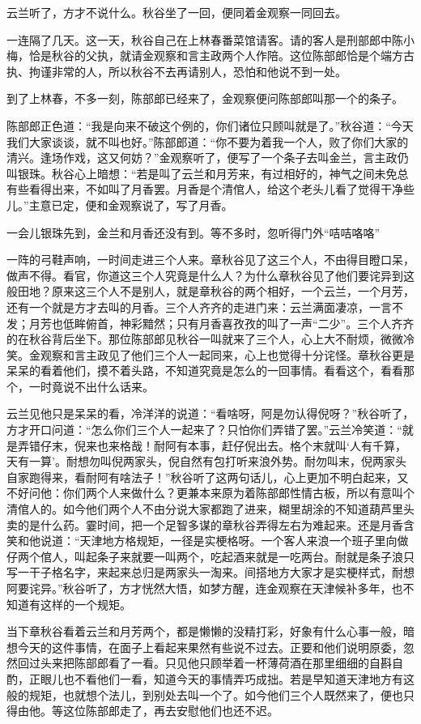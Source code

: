 \documentclass[12pt,UTF8]{ctexbook}
\begin{document}
{{{云兰听了，方才不说什么。秋谷坐了一回，便同着金观察一同回去。

一连隔了几天。这一天，秋谷自己在上林春番菜馆请客。请的客人是刑部郎中陈小梅，恰是秋谷的父执，就请金观察和言主政两个人作陪。这位陈部郎恰是个端方古执、拘谨非常的人，所以秋谷不去再请别人，恐怕和他说不到一处。

到了上林春，不多一刻，陈部郎已经来了，金观察便问陈部郎叫那一个的条子。

陈部郎正色道：“我是向来不破这个例的，你们诸位只顾叫就是了。”秋谷道：“今天我们大家谈谈，就不叫也好。”陈部郎道：“你不要为着我一个人，败了你们大家的清兴。逢场作戏，这又何妨？”金观察听了，便写了一个条子去叫金兰，言主政仍叫银珠。秋谷心上暗想：“若是叫了云兰和月芳来，有过相好的，神气之间未免总有些看得出来，不如叫了月香罢。月香是个清倌人，给这个老头儿看了觉得干净些儿。”主意已定，便和金观察说了，写了月香。

一会儿银珠先到，金兰和月香还没有到。等不多时，忽听得门外“咭咭咯咯”

一阵的弓鞋声响，一时间走进三个人来。章秋谷见了这三个人，不由得目瞪口呆，做声不得。看官，你道这三个人究竟是什么人？为什么章秋谷见了他们要诧异到这般田地？原来这三个人不是别人，就是章秋谷的两个相好，一个云兰，一个月芳，还有一个就是方才去叫的月香。三个人齐齐的走进门来：云兰满面凄凉，一言不发；月芳也低眸俯首，神彩黯然；只有月香喜孜孜的叫了一声“二少”。三个人齐齐的在秋谷背后坐下。那位陈部郎见秋谷一叫就来了三个人，心上大不耐烦，微微冷笑。金观察和言主政见了他们三个人一起同来，心上也觉得十分诧怪。章秋谷更是呆呆的看着他们，摸不着头路，不知道究竟是怎么的一回事情。看看这个，看看那个，一时竟说不出什么话来。

云兰见他只是呆呆的看，冷洋洋的说道：“看啥呀，阿是勿认得倪呀？”秋谷听了，方才开口问道：“怎么你们三个人一起来了？只怕你们弄错了罢。”云兰冷笑道：“就是弄错仔末，倪来也来格哉！耐阿有本事，赶仔倪出去。格个末就叫‘人有千算，天有一算’。耐想勿叫倪两家头，倪自然有包打听来浪外势。耐勿叫末，倪两家头自家跑得来，看耐阿有啥法子！”秋谷听了这两句话儿，心上更加不明白起来，又不好问他：你们两个人来做什么？更兼本来原为着陈部郎性情古板，所以有意叫个清倌人的。如今他们两个人不由分说大家都跑了进来，糊里胡涂的不知道葫芦里头卖的是什么药。霎时间，把一个足智多谋的章秋谷弄得左右为难起来。还是月香含笑和他说道：“天津地方格规矩，一径是实梗格呀。一个客人来浪一个班子里向做仔两个倌人，叫起条子来就要一叫两个，吃起酒来就是一吃两台。耐就是条子浪只写一干子格名字，来起来总归是两家头一淘来。间搭地方大家才是实梗样式，耐想阿要诧异。”秋谷听了，方才恍然大悟，如梦方醒，连金观察在天津候补多年，也不知道有这样的一个规矩。

当下章秋谷看着云兰和月芳两个，都是懒懒的没精打彩，好象有什么心事一般，暗想今天的这件事情，在面子上看起来果然有些说不过去。正要和他们说明原委，忽然回过头来把陈部郎看了一看。只见他只顾举着一杯薄荷酒在那里细细的自斟自酌，正眼儿也不看他们一看，知道今天的事情弄巧成拙。若是早知道天津地方有这般的规矩，也就想个法儿，到别处去叫一个了。如今他们三个人既然来了，便也只得由他。等这位陈部郎走了，再去安慰他们也还不迟。

}}}
\end{document}
